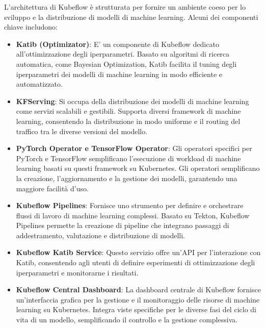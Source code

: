 L'architettura di Kubeflow è strutturata per fornire un ambiente coeso per lo sviluppo e la distribuzione di modelli di machine learning. Alcuni dei componenti chiave includono:

\begin{itemize}
    \item \textbf{Katib (Optimizator)}: E' un componente di Kubeflow dedicato all'ottimizzazione degli iperparametri. Basato su algoritmi di ricerca automatica, come Bayesian Optimization, Katib facilita il tuning degli iperparametri dei modelli di machine learning in modo efficiente e automatizzato.

    \item \textbf{KFServing}: Si occupa della distribuzione dei modelli di machine learning come servizi scalabili e gestibili. Supporta diversi framework di machine learning, consentendo la distribuzione in modo uniforme e il routing del traffico tra le diverse versioni del modello.

    \item \textbf{PyTorch Operator e TensorFlow Operator}: Gli operatori specifici per PyTorch e TensorFlow semplificano l'esecuzione di workload di machine learning basati su questi framework su Kubernetes. Gli operatori semplificano la creazione, l'aggiornamento e la gestione dei modelli, garantendo una maggiore facilità d'uso.

    \item \textbf{Kubeflow Pipelines}: Fornisce uno strumento per definire e orchestrare flussi di lavoro di machine learning complessi. Basato su Tekton, Kubeflow Pipelines permette la creazione di pipeline che integrano passaggi di addestramento, valutazione e distribuzione di modelli.

    \item \textbf{Kubeflow Katib Service}: Questo servizio offre un'API per l'interazione con Katib, consentendo agli utenti di definire esperimenti di ottimizzazione degli iperparametri e monitorarne i risultati.

    \item \textbf{Kubeflow Central Dashboard}: La dashboard centrale di Kubeflow fornisce un'interfaccia grafica per la gestione e il monitoraggio delle risorse di machine learning su Kubernetes. Integra viste specifiche per le diverse fasi del ciclo di vita di un modello, semplificando il controllo e la gestione complessiva.
\end{itemize}


